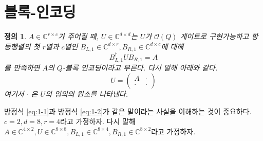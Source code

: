 \documentclass[a4paper,atbegshi,chapter,]{oblivoir}
\newtheorem{defn}{정의}[chapter]
\begin{document}
\section{블록-인코딩}
\begin{defn}
  $A\in\mathbb{C}^{r\times c}$가 주어질 때, $U\in\mathbb{C}^{d\times d}$는
  $U$가 $\mathcal{O}(Q)$ 게이트로 구현가능하고 항등행렬의 첫 $r$열과 $c$열인
  $B_{L,1}\in\mathbb{C}^{d\times r},B_{R,1}\in\mathbb{C}^{d\times c}$에 대해
  \begin{equation}\label{eq:1-1}
    B_{L,1}^{\dagger}UB_{R,1} = A
  \end{equation}
  를 만족하면 $A$의 $Q$-블록 인코딩이라고 부른다. 다시 말해 아래와 같다.
  \begin{equation}\label{eq:1-2}
    U = \begin{pmatrix}A&\cdot\\\cdot&\cdot\end{pmatrix}
  \end{equation}
  여기서 $\cdot$ 은 $U$의 임의의 원소를 나타낸다. 
\end{defn}
방정식 \ref{eq:1-1}과 방정식 \ref{eq:1-2}가 같은 말이라는 사실을 이해하는
것이 중요하다. $c=2,d=8,r=4$라고 가정하자. 다시 말해 $A\in\mathbb{C}^{4\times2},
U\in\mathbb{C}^{8\times 8}, B_{L,1}\in\mathbb{C}^{8\times 4}, 
B_{R,1}\in\mathbb{C}^{8\times 2}$라고 가정하자.
\end{document}
